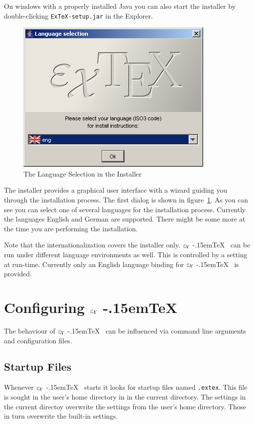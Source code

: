 \documentclass[12pt,div12,a4paper]{scrbook}
\providecommand*{\ExTeX}{\ifx\texorpdfstring\undefined
  \textrm{%
    \ensuremath{\textstyle\varepsilon_{\kern-0.15em\mathcal{X}}}%
    \kern-.15em\TeX}%
  \else\texorpdfstring{%
  \textrm{%
    \ensuremath{\textstyle\varepsilon_{\kern-0.15em\mathcal{X}}}%
    \kern-.15em\TeX
  }}{ExTeX}%
  \fi
}
\begin{document}
On windows with a properly installed Java you can also start the
installer by double-clicking \texttt{ExTeX-setup.jar} in the Explorer.

\begin{figure}[htp]
  \centering
  \includegraphics[width=.5\textwidth]{inst1.png}
  \caption{The Language Selection in the Installer}
  \label{fig:inst1}
\end{figure}

The installer provides a graphical user interface with a wizard
guiding you through the installation process. The first dialog is
shown in figure~\ref{fig:inst1}. As you can see you can select one of
several languages for the installation process. Currently the
languages English and German are supported. There might be some more
at the time you are performing the installation.

Note that the internationalization covers the installer only. \ExTeX\
can be run under different language environments as well. This is
controlled by a setting at run-time. Currently only an English
language binding for \ExTeX\ is provided.


\chapter{Configuring \ExTeX}

The behaviour of \ExTeX\ can be influenced via command line arguments
and configuration files.


\section{Startup Files}

Whenever \ExTeX\ starts it looks for startup files named
\texttt{.extex}. This file is sought in the user's home directory in
in the current directory. The settings in the current directoy
overwrite the settings from the user's home directory. Those in turn
overwrite the built-in settings.
\end{document}
